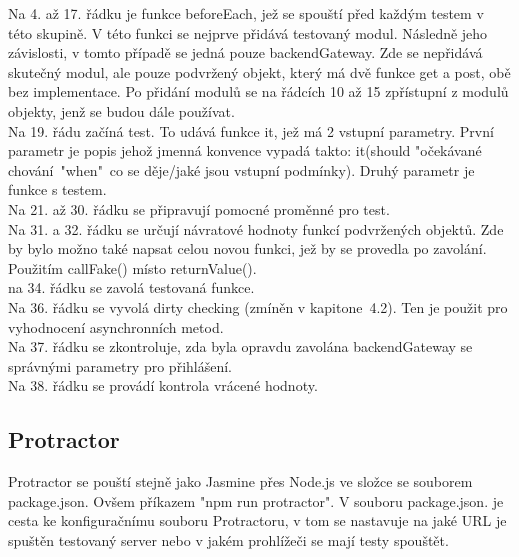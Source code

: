 \documentclass[czech,master,public,dept460,male,cpdeclaration,twoside]{diploma}
\begin{document}
Na 4. až 17. řádku je funkce beforeEach, jež se spouští před každým testem v této skupině. V této funkci se nejprve přidává testovaný modul. Následně jeho závislosti, v tomto případě se jedná pouze backendGateway. Zde se nepřidává skutečný modul, ale pouze podvržený objekt, který má dvě funkce get a post, obě bez implementace. Po přidání modulů se na řádcích 10 až 15 zpřístupní z modulů objekty, jenž se budou dále používat.\\
Na 19. řádu začíná test. To udává funkce it, jež má 2 vstupní parametry. První parametr je popis jehož jmenná konvence vypadá takto: it(should "očekávané chování~"when"~co se děje/jaké jsou vstupní podmínky). Druhý parametr je funkce s testem.\\
Na 21. až 30. řádku se připravují pomocné proměnné pro test.\\
Na 31. a 32. řádku se určují návratové hodnoty funkcí podvržených objektů. Zde by bylo možno také napsat celou novou funkci, jež by se provedla po zavolání. Použitím callFake() místo returnValue().\\
na 34. řádku se zavolá testovaná funkce.\\
Na 36. řádku se vyvolá dirty checking (zmíněn v kapitone~4.2). Ten je použit pro vyhodnocení asynchronních metod.\\
Na 37. řádku se zkontroluje, zda byla opravdu zavolána backendGateway se správnými parametry pro přihlášení.\\
Na 38. řádku se provádí kontrola vrácené hodnoty.\\

\subsection{Protractor}
Protractor se pouští stejně jako Jasmine přes Node.js ve složce se souborem package.json. Ovšem příkazem "npm run protractor". V souboru package.json. je cesta ke konfiguračnímu souboru Protractoru, v tom se nastavuje na jaké URL je spuštěn testovaný server nebo v jakém prohlížeči se mají testy spouštět. 
\end{document}
